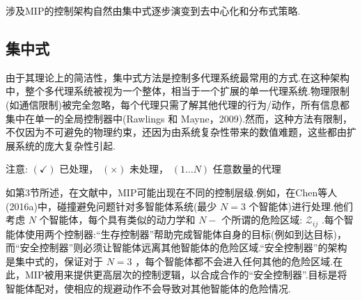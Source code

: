 \documentclass[10pt]{article}
\begin{document}
涉及MIP的控制架构自然由集中式逐步演变到去中心化和分布式策略.

\begin{table}[h]
  \centering
  \caption{运动规划中MIP方法的分类.}
\end{table}

\subsection{集中式}

由于其理论上的简洁性，集中式方法是控制多代理系统最常用的方式.在这种架构中，整个多代理系统被视为一个整体，相当于一个扩展的单一代理系统.物理限制(如通信限制)被完全忽略，每个代理只需了解其他代理的行为/动作，所有信息都集中在单一的全局控制器中(Rawlings 和 Mayne，2009).然而，这种方法有限制，不仅因为不可避免的物理约束，还因为由系统复杂性带来的数值难题，这些都由扩展系统的庞大复杂性引起.



注意: \(\left( \checkmark \right)\) 已处理， \(\left( \times \right)\) 未处理， \(\left( {1\ldots N}\right)\) 任意数量的代理

如第3节所述，在文献中，MIP可能出现在不同的控制层级.例如，在Chen等人(2016a)中，碰撞避免问题针对多智能体系统(最少 \(N = 3\) 个智能体)进行处理.他们考虑 \(N\) 个智能体，每个具有类似的动力学和 \(N -\) 个所谓的危险区域: \({\mathcal{Z}}_{ij}\) .每个智能体使用两个控制器:“生存控制器”帮助完成智能体自身的目标(例如到达目标)，而“安全控制器”则必须让智能体远离其他智能体的危险区域.“安全控制器”的架构是集中式的，保证对于 \(N = 3\) ，每个智能体都不会进入任何其他的危险区域.在此，MIP被用来提供更高层次的控制逻辑，以合成合作的“安全控制器”.目标是将智能体配对，使相应的规避动作不会导致对其他智能体的危险情况.
\end{document}
